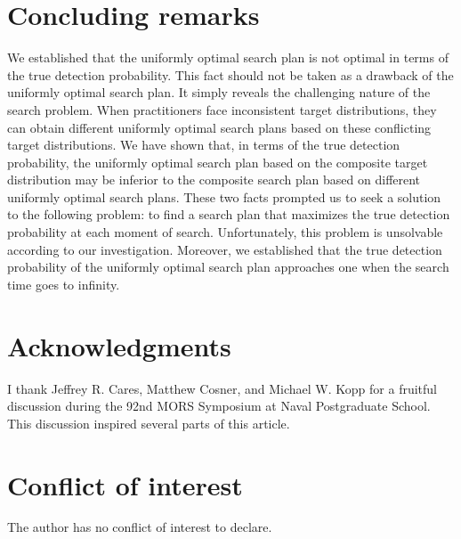 \documentclass[12pt]{article}
\theoremstyle{plain}
\theoremstyle{definition}
\theoremstyle{remark}
\begin{document}
%
\section{Concluding remarks}


We established that the uniformly optimal search plan is not optimal in terms of the true detection probability. This fact should not be taken as a drawback of the uniformly optimal search plan.  It simply reveals the challenging nature of the search problem.  When practitioners face inconsistent target distributions, they can obtain different uniformly optimal search plans based on these conflicting target distributions.  We have shown that, in terms of the true detection probability, the uniformly optimal search plan based on the composite target distribution may be inferior to the composite search plan based on different uniformly optimal search plans.  These two facts prompted us to seek a solution to the following problem: to find a search plan that maximizes the true detection probability at each moment of search.  Unfortunately,  this problem is unsolvable according to our investigation.  Moreover,  we established that the true detection probability of the uniformly optimal search plan approaches one when the search time goes to infinity.  


\section*{Acknowledgments}
I thank Jeffrey R. Cares,  Matthew Cosner, and Michael W. Kopp for a fruitful discussion during the 92nd MORS Symposium at Naval Postgraduate School. This discussion inspired several parts of this article.



\section*{Conflict of interest}
The author has no conflict of interest to declare.

\end{document}

